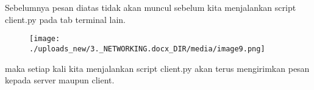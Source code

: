 \documentclass[a4paper,12pt]{report}
\begin{document}
Sebelumnya pesan diatas tidak akan muncul sebelum kita menjalankan script client.py pada tab terminal lain. \par
\begin{center}



\begin{figure}[H]
\begin{center}
\texttt{[image: ./uploads\_new/3.\_NETWORKING.docx\_DIR/media/image9.png]}
\end{center}
\end{figure}




\end{center}\vspace{12pt}
maka setiap kali kita menjalankan script client.py akan terus mengirimkan pesan kepada server maupun client. \par
\noindent 
\vspace{12pt}
\end{document}
